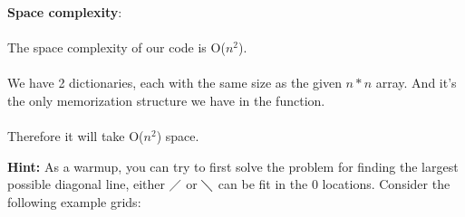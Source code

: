 \documentclass{assignment-373}
\begin{document}
\begin{enumerate}
        {\bf Space complexity}: \\
  \\
  \phantom{=} \phantom{=} The space complexity of our code is O($n^2$).\\
  \\
  \phantom{=} \phantom{=} We have 2 dictionaries, each with the same size as the given $n*n$ array. And it's the only memorization structure we have in the function.\\
  \\
  \phantom{=} \phantom{=} Therefore it will take O($n^2$) space. 
  \\
  \end{enumerate}

  \textbf{Hint:} As a warmup, you can try to first solve the problem
  for finding the largest possible diagonal line, either $ \diagup$ or
  $\diagdown$ can be fit in the 0 locations. Consider the following
  example grids:
    
\end{document}

